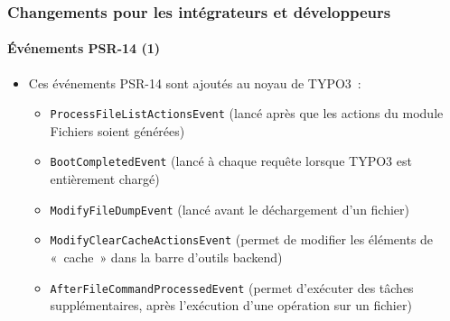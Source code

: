 %

\begin{frame}[fragile]
	\frametitle{Changements pour les intégrateurs et développeurs}
	\framesubtitle{Événements PSR-14 (1)}


	\begin{itemize}
		\item Ces événements PSR-14 sont ajoutés au noyau de TYPO3~:
			\begin{itemize}
				\item \texttt{ProcessFileListActionsEvent}\newline
					(lancé après que les actions du module Fichiers soient générées)
				\vspace{0.1cm}
				\item \texttt{BootCompletedEvent}\newline
					(lancé à chaque requête lorsque TYPO3 est entièrement chargé)
				\vspace{0.1cm}
				\item \texttt{ModifyFileDumpEvent}\newline
					(lancé avant le déchargement d'un fichier)
				\vspace{0.1cm}
				\item \texttt{ModifyClearCacheActionsEvent}\newline
					(permet de modifier les éléments de «~cache~» dans la barre d'outils backend)
				\vspace{0.1cm}
				\item \texttt{AfterFileCommandProcessedEvent}\newline
					(permet d'exécuter des tâches supplémentaires, après l'exécution d'une opération sur un fichier)
			\end{itemize}
	\end{itemize}
\end{frame}

